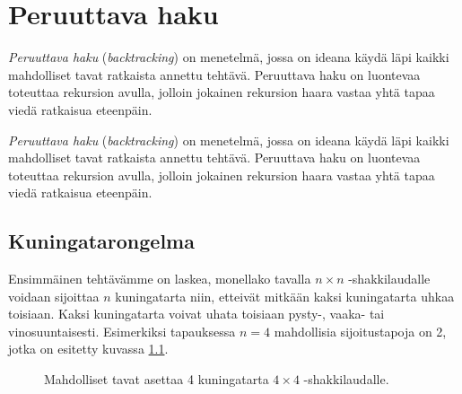 \chapter{Peruuttava haku}

\emph{Peruuttava haku} (\emph{backtracking}) on menetelmä,
jossa on ideana käydä läpi kaikki mahdolliset tavat 
ratkaista annettu tehtävä.
Peruuttava haku on luontevaa toteuttaa rekursion avulla,
jolloin jokainen rekursion haara vastaa yhtä tapaa
viedä ratkaisua eteenpäin.

\emph{Peruuttava haku} (\emph{backtracking}) on menetelmä,
jossa on ideana käydä läpi kaikki mahdolliset tavat 
ratkaista annettu tehtävä.
Peruuttava haku on luontevaa toteuttaa rekursion avulla,
jolloin jokainen rekursion haara vastaa yhtä tapaa
viedä ratkaisua eteenpäin.

\section{Kuningatarongelma}

Ensimmäinen tehtävämme on
laskea, monellako tavalla $n \times n$ -shakkilaudalle voidaan
sijoittaa $n$ kuningatarta niin, etteivät mitkään kaksi kuningatarta
uhkaa toisiaan. Kaksi kuningatarta voivat uhata toisiaan
pysty-, vaaka- tai vinosuuntaisesti.
Esimerkiksi tapauksessa $n=4$ mahdollisia sijoitustapoja on 2,
jotka on esitetty kuvassa \ref{fig:kuning}.


\begin{figure}
\center
{}
\caption{Mahdolliset tavat asettaa 4 kuningatarta $4 \times 4$ -shakkilaudalle.}
\label{fig:kuning}
\end{figure}

